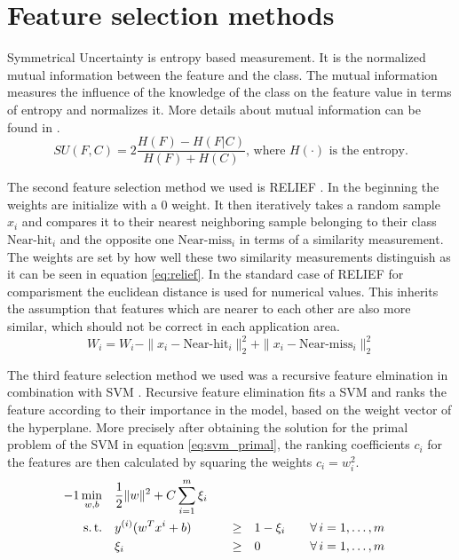 \documentclass[twoside,11pt]{article}
\begin{document}
\section{Feature selection methods}

Symmetrical Uncertainty \citep{press1996numerical} is entropy based measurement. It is the normalized mutual information between the feature
and the class. The mutual information measures the influence of the knowledge of the class on the feature value
in terms of entropy and normalizes it. More details about mutual information can be found in \cite{paninski2003estimation}.
\begin{equation}
  \label{eq:su}
  SU(F,C) = 2 \frac{H(F) - H(F|C)}{H(F) + H(C)} \textrm{, where } H(\cdot) \textrm{ is the entropy.}
\end{equation}

The second feature selection method we used is RELIEF \citep{kira1992feature}. In the beginning the weights are initialize
with a $0$ weight.
It then iteratively takes a random sample $x_i$ and compares it to their nearest neighboring sample belonging to their class
$\textrm{Near-hit}_i$ and the opposite one $\textrm{Near-miss}_i$ in terms of a similarity measurement.
The weights are set by how well these two similarity measurements distinguish as it can be seen in equation \ref{eq:relief}.
In the standard case of RELIEF for comparisment the euclidean distance is used for numerical values. This inherits the
assumption that features which are nearer to each other are also more similar, which should not be correct in each application
area.
\begin{equation}
  \label{eq:relief}
  W_i = W_i - \|x_i - \textrm{Near-hit}_i\|_2^2 + \|x_i - \textrm{Near-miss}_i\|_2^2
\end{equation}

The third feature selection method we used was a recursive feature elmination in combination with SVM \citep{guyon2002gene}.
Recursive feature elimination fits a SVM and ranks the feature according to their importance in the model,
based on the weight vector of the hyperplane.
More precisely after obtaining the solution for the primal problem of the SVM in equation \ref{eq:svm_primal},
the ranking coefficients $c_i$ for the features are then calculated by squaring the weights $c_i = w_i^2$.
\begin{alignat}{-1}
     \min_{w,b}  & \quad \frac12\|w\|^2 + C\sum_{i=1}^m \xi_i & & & \label{eq:svm_primal} \\ 
   \text{s.\,t.} & \quad y^{(i)} (w^Tx^{i} + b) & \quad \geq & \quad 1 -\xi_i &&
                   \quad \forall \, i = 1, \ldots, m \nonumber \\
                 & \quad \xi_i                  & \quad \geq & \quad 0 &&
                   \quad \forall \, i = 1, \ldots, m \nonumber 
\end{alignat}
\end{document}
